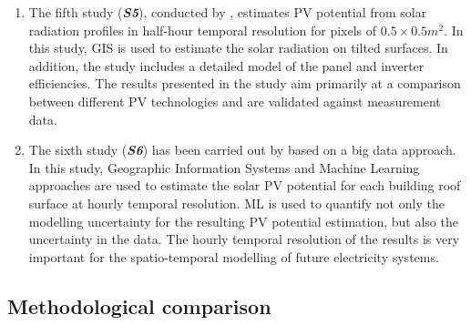 \begin{enumerate}
\item The fifth study (\textbf{\textit{S5}}), conducted by \citet{buffat_scalable_2018}, estimates PV potential from solar radiation profiles in half-hour temporal resolution for pixels of $0.5 \times 0.5 m^2$. In this study, GIS is used to estimate the solar radiation on tilted surfaces. In addition, the study includes a detailed model of the panel and inverter efficiencies. The results presented in the study aim primarily at a comparison between different PV technologies and are validated against measurement data.
\item The sixth study (\textbf{\textit{S6}}) has been carried out by \citet{walch_big_2020} based on a big data approach. In this study, Geographic Information Systems and Machine Learning approaches are used to estimate the solar PV potential for each building roof surface at hourly temporal resolution. ML is used to quantify not only the modelling uncertainty for the resulting PV potential estimation, but also the uncertainty in the data. The hourly temporal resolution of the results is very important for the spatio-temporal modelling of future electricity systems.   
\end{enumerate}

\subsection{Methodological comparison}

